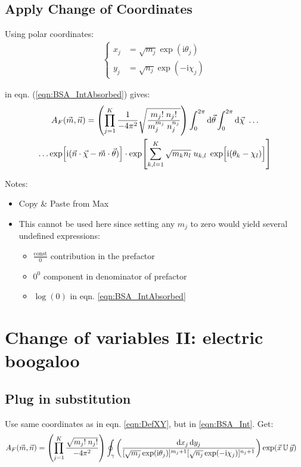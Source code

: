 \documentclass[
	english,
	a4paper,
	fontsize=10pt,
	parskip=half,
	titlepage=true,
	DIV=12,
	final
]{scrreprt}
\newcommand*{\iunit}{\ensuremath{\mathrm{i}}}
\begin{document}
\subsection{Apply Change of Coordinates}
Using polar coordinates:
\begin{align}
	\begin{cases}
	x_j &= \sqrt{m_j} \exp( \iunit \theta_j) \\
	y_j &= \sqrt{n_j} \exp(-\iunit \chi  _j)
	\end{cases}
	\label{eqn:DefXY}
\end{align}

in eqn. (\ref{eqn:BSA_IntAbsorbed}) gives:
\begin{multline}
	A_F(\vec{m}, \vec{n})
=
	\qty(
		\prod_{j=1}^{K}
		\frac
			{1}
			{-4\pi^{2}}
		\sqrt{\frac
			{m_j!      \; n_j!}
			{m_j^{m_j} \; n_j^{n_j} }
		}
	)
	\int_{0}^{2\pi} \dd{\vec{\theta}}
	\int_{0}^{2\pi} \dd{\vec{\chi}}\ \ldots \\
		\ldots		
		\exp[\iunit (\vec{n} \cdot \vec{\chi}  -  \vec{m} \cdot \vec{\theta})] \cdot 
		\exp[\sum_{k,l=1}^{K} \sqrt{m_k n_l} \; u_{k,l} \; \exp[\Big.\iunit(\theta_k - \chi_l)] ]
\end{multline}

Notes:
\begin{itemize}
\item Copy \& Paste from Max
\item This cannot be used here since setting any $m_j$ to zero would yield several undefined expressions:
	\begin{itemize}
	\item $\frac{\text{const}}{0}$ contribution in the prefactor 
	\item $0^0$ component in denominator of prefactor
	\item $\log(0)$ in eqn. \ref{eqn:BSA_IntAbsorbed}
	\end{itemize}
	
\end{itemize}


\section{Change of variables II: electric boogaloo}
\subsection{Plug in substitution}
Use same coordinates as in eqn. \ref{eqn:DefXY}, but in \ref{eqn:BSA_Int}. Get:
\begin{align}
	A_F(\vec{m}, \vec{n})
&=
	\qty(
		\prod_{j=1}^{K}
		\frac
			{\sqrt{m_j! \; n_j!}}
			{-4\pi^{2}}
	)
	\oint_{\gamma}
		\qty(
			\frac
			{\dd{x_j} \dd{y_j}}
			{[\sqrt{m_j} \exp( \iunit \theta_j)]^{m_j+1}
			 [\sqrt{n_j} \exp(-\iunit \chi  _j)]^{n_j+1}}
		)
		\exp(\vec{x} \, \mathbb{U} \, \vec{y})
\end{align}
\end{document}
